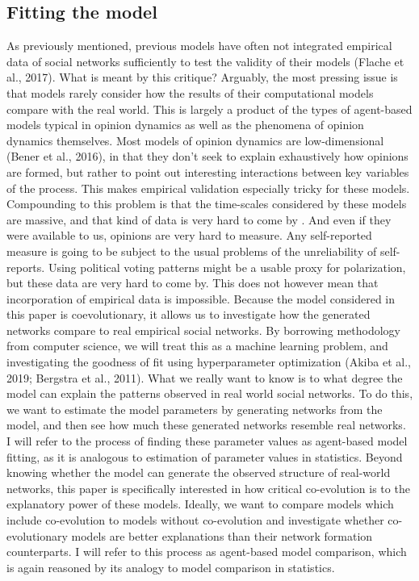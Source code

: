 \documentclass{article}
\begin{document}
\subsection{Fitting the model}
As previously mentioned, previous models have often not integrated empirical data of social networks sufficiently to test the validity of their models (Flache et al., 2017). What is meant by this critique? Arguably, the most pressing issue is that models rarely consider how the results of their computational models compare with the real world. This is largely a product of the types of agent-based models typical in opinion dynamics as well as the phenomena of opinion dynamics themselves. Most models of opinion dynamics are low-dimensional (Bener et al., 2016), in that they don’t seek to explain exhaustively how opinions are formed, but rather to point out interesting interactions between key variables of the process. This makes empirical validation especially tricky for these models. Compounding to this problem is that the time-scales considered by these models are massive, and that kind of data is very hard to come by \cite{mas2019challenges}. And even if they were available to us, opinions are very hard to measure. Any self-reported measure is going to be subject to the usual problems of the unreliability of self-reports. Using political voting patterns might be a usable proxy for polarization, but these data are very hard to come by. 
This does not however mean that incorporation of empirical data is impossible. Because the model considered in this paper is coevolutionary, it allows us to investigate how the generated networks compare to real empirical social networks. By borrowing methodology from computer science, we will treat this as a machine learning problem, and investigating the goodness of fit using hyperparameter optimization (Akiba et al., 2019; Bergstra et al., 2011). What we really want to know is to what degree the model can explain the patterns observed in real world social networks. To do this, we want to estimate the model parameters by generating networks from the model, and then see how much these generated networks resemble real networks. I will refer to the process of finding these parameter values as agent-based model fitting, as it is analogous to estimation of parameter values in statistics. Beyond knowing whether the model can generate the observed structure of real-world networks, this paper is specifically interested in how critical co-evolution is to the explanatory power of these models. Ideally, we want to compare models which include co-evolution to models without co-evolution and investigate whether co-evolutionary models are better explanations than their network formation counterparts. I will refer to this process as agent-based model comparison, which is again reasoned by its analogy to model comparison in statistics. 
\end{document}
